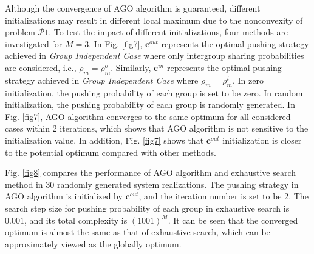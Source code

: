 \documentclass[12pt, draftclsnofoot, onecolumn]{IEEEtran}
\begin{document}
Although the convergence of  AGO algorithm is guaranteed, different initializations may result in different local maximum due to the nonconvexity of problem $\mathcal{P}1$. To test the impact of different initializations, four methods are investigated for $M=3$.
In Fig. \ref{fig7}, $\bm{c}^{out}$ represents the optimal pushing strategy achieved in \textit{Group Independent Case} where only intergroup sharing probabilities are considered, i.e., $\rho_m=\rho_m^o$. Similarly, $\bm{c}^{in}$ represents the optimal pushing strategy achieved in \textit{Group Independent Case} where $\rho_m=\rho_m^i$.
In zero initialization, the pushing probability of each group is set to be zero.
In random initialization, the pushing probability of each group is randomly generated. In Fig. \ref{fig7}, AGO algorithm converges to the same optimum for all considered cases within 2 iterations, which shows that  AGO algorithm is not sensitive to the initialization value. In addition, Fig. \ref{fig7} shows that $\bm{c}^{out}$ initialization is closer to the potential optimum compared with other methods.

Fig. \ref{fig8} compares the performance of  AGO algorithm and exhaustive search method in 30 randomly generated system realizations. The pushing strategy in AGO algorithm is initialized by $\bm{c}^{out}$, and the iteration number is set to be 2. The search step size for pushing probability of each group in exhaustive search is $0.001$, and its total complexity is $(1001)^M$.
It can be seen that the converged optimum is almost the same as that of exhaustive search, which can be approximately viewed as the globally optimum.


\end{document}
